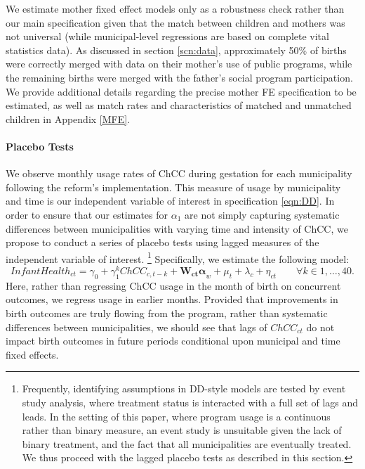 \documentclass[12pt]{article}
\begin{document}
\begin{spacing}{1.4}
We estimate mother fixed effect models only as a robustness check
rather than our main specification given that the match between
children and mothers was not universal (while municipal-level
regressions are based on complete vital statistics data).  As
discussed in section \ref{scn:data}, approximately 50\% of births
were correctly merged with data on their mother's use of public
programs, while the remaining births were merged with the father's
social program participation. We provide additional details regarding
the precise mother FE specification to be estimated, as well as match
rates and characteristics of matched and unmatched children in
Appendix \ref{MFE}.

\paragraph{Placebo Tests} We observe monthly usage rates of ChCC
during gestation for each
municipality following the reform's implementation.  This measure
of usage by municipality and time is our independent variable of
interest in specification \ref{eqn:DD}.  In order to ensure that
our estimates for $\alpha_1$ are not simply capturing systematic
differences between municipalities with varying time and intensity
of ChCC, we propose to conduct a series of placebo tests using
lagged measures of the independent variable of interest.%
\footnote{Frequently, identifying assumptions in DD-style models
  are tested by event study analysis, where treatment status is
  interacted with a full set of lags and leads.  In the setting of
  this paper, where program usage is a continuous rather than
  binary measure, an event study is unsuitable given the lack of
  binary treatment, and the fact that all municipalities are
  eventually treated.  We thus proceed with the lagged placebo
  tests as described in this section.}
Specifically, we estimate the following model:
\begin{equation}
  \label{eqn:placebo}
  Infant Health_{ct} = \gamma_0 + \gamma_1^k ChCC_{c,t-k} + \bm{W_{ct}\alpha}_{w} + \mu_t + \lambda_c + \eta_{ct} \qquad \forall k \in {1,\ldots,40}.
\end{equation}
Here, rather than regressing ChCC usage in the month of birth on
concurrent outcomes, we regress usage in earlier months.  Provided
that improvements in birth outcomes are truly flowing from the
program, rather than systematic differences between municipalities,
we should see that lags of $ChCC_{ct}$ do not impact birth outcomes
in future periods conditional upon municipal and time fixed effects.


\end{spacing}
\end{document}
